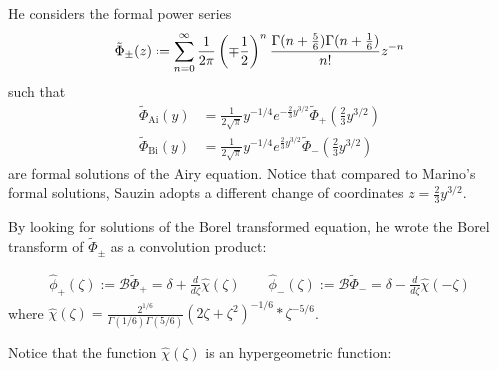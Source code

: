 \documentclass{article}
\newcommand*{\defeq}{\mathrel{\vcenter{\baselineskip0.5ex \lineskiplimit0pt
                     \hbox{\scriptsize.}\hbox{\scriptsize.}}}%
                     =}
\newcommand{\borel}{\mathcal{B}}
\theoremstyle{definition}
\theoremstyle{plain}
\begin{document}
He considers the formal power series  
\[\tilde{\Phi}_{\pm}(z)\defeq \sum_{n=0}^{\infty}\frac{1}{2\pi}\left(\mp\frac{1}{2}\right)^{n}\frac{\Gamma(n+\frac{5}{6})\Gamma(n+\frac{1}{6})}{n!}z^{-n}\]
such that
\begin{align*}
\tilde{\Phi}_{\mathrm{Ai}}(y)&=\frac{1}{2\sqrt{\pi}}y^{-1/4}e^{-\tfrac{2}{3}y^{3/2}}\tilde{\Phi}_{+}\left(\tfrac{2}{3}y^{3/2}\right)\\
\tilde{\Phi}_{\mathrm{Bi}}(y)&=\frac{1}{2\sqrt{\pi}}y^{-1/4}e^{\tfrac{2}{3}y^{3/2}}\tilde{\Phi}_{-}\left(\tfrac{2}{3}y^{3/2}\right)
\end{align*} 
are formal solutions of the Airy equation. Notice that compared to Marino's formal solutions, Sauzin adopts a different change of coordinates $z=\frac{2}{3}y^{3/2}$.  

By looking for solutions of the Borel transformed equation, he wrote the Borel transform of $\tilde{\Phi}_{\pm}$ as a convolution product: 

\begin{align*}
\hat{\phi}_+(\zeta):=\borel\tilde{\Phi}_+=\delta+\frac{d}{d\zeta}\hat{\chi}(\zeta)  \qquad \hat{\phi}_-(\zeta):=\borel\tilde{\Phi}_-=\delta-\frac{d}{d\zeta}\hat{\chi}(-\zeta)
\end{align*}
 where $\hat{\chi}(\zeta)=\frac{2^{1/6}}{\Gamma(1/6)\Gamma(5/6)}(2\zeta+\zeta^2)^{-1/6}\ast \zeta^{-5/6}$.

%

Notice that the function $\hat{\chi}(\zeta)$ is an hypergeometric function:
\end{document}

